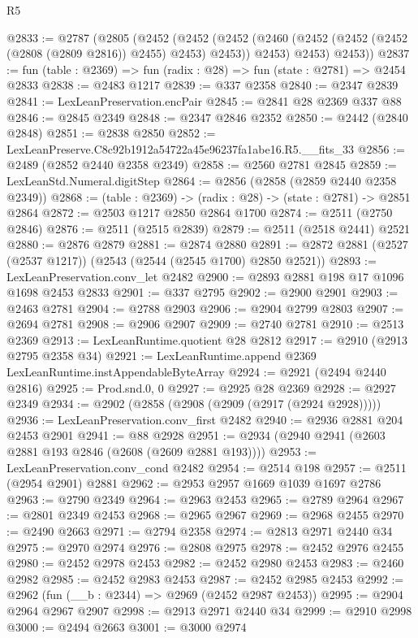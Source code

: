 \begin{lexlean}{R5}
\begin{coremodule}
@2833 := @2787
    (@2805
      (@2452
        (@2452
          (@2452 (@2460 (@2452 (@2452 (@2452 (@2808 (@2809 @2816)) @2455) @2453) @2453)) @2453)
          @2453)
        @2453))
@2837 := fun (table : @2369) => fun (radix : @28) => fun (state : @2781) => @2454 @2833
@2838 := @2483 @1217
@2839 := @337 @2358
@2840 := @2347 @2839
@2841 := LexLeanPreservation.encPair
@2845 := @2841 @28 @2369 @337 @88
@2846 := @2845 @2349
@2848 := @2347 @2846 @2352
@2850 := @2442 (@2840 @2848)
@2851 := @2838 @2850
@2852 := LexLeanPreserve.C8c92b1912a54722a45e96237fa1abe16.R5.__fits_33
@2856 := @2489 (@2852 @2440 @2358 @2349)
@2858 := @2560 @2781 @2845
@2859 := LexLeanStd.Numeral.digitStep
@2864 := @2856 (@2858 (@2859 @2440 @2358 @2349))
@2868 := (table : @2369) -> (radix : @28) -> (state : @2781) -> @2851 @2864
@2872 := @2503 @1217 @2850 @2864 @1700
@2874 := @2511 (@2750 @2846)
@2876 := @2511 (@2515 @2839)
@2879 := @2511 (@2518 @2441) @2521
@2880 := @2876 @2879
@2881 := @2874 @2880
@2891 := @2872 @2881 (@2527 (@2537 @1217)) (@2543 (@2544 (@2545 @1700) @2850 @2521))
@2893 := LexLeanPreservation.conv_let @2482
@2900 := @2893 @2881 @198 @17 @1096 @1698 @2453 @2833
@2901 := @337 @2795
@2902 := @2900 @2901
@2903 := @2463 @2781
@2904 := @2788 @2903
@2906 := @2904 @2799 @2803
@2907 := @2694 @2781
@2908 := @2906 @2907
@2909 := @2740 @2781
@2910 := @2513 @2369
@2913 := LexLeanRuntime.quotient @28 @2812
@2917 := @2910 (@2913 @2795 @2358 @34)
@2921 := LexLeanRuntime.append @2369 LexLeanRuntime.instAppendableByteArray
@2924 := @2921 (@2494 @2440 @2816)
@2925 := Prod.snd.{0, 0}
@2927 := @2925 @28 @2369
@2928 := @2927 @2349
@2934 := @2902 (@2858 (@2908 (@2909 (@2917 (@2924 @2928)))))
@2936 := LexLeanPreservation.conv_first @2482
@2940 := @2936 @2881 @204 @2453 @2901
@2941 := @88 @2928
@2951 := @2934 (@2940 @2941 (@2603 @2881 @193 @2846 (@2608 (@2609 @2881 @193))))
@2953 := LexLeanPreservation.conv_cond @2482
@2954 := @2514 @198
@2957 := @2511 (@2954 @2901) @2881
@2962 := @2953 @2957 @1669 @1039 @1697 @2786
@2963 := @2790 @2349
@2964 := @2963 @2453
@2965 := @2789 @2964
@2967 := @2801 @2349 @2453
@2968 := @2965 @2967
@2969 := @2968 @2455
@2970 := @2490 @2663
@2971 := @2794 @2358
@2974 := @2813 @2971 @2440 @34
@2975 := @2970 @2974
@2976 := @2808 @2975
@2978 := @2452 @2976 @2455
@2980 := @2452 @2978 @2453
@2982 := @2452 @2980 @2453
@2983 := @2460 @2982
@2985 := @2452 @2983 @2453
@2987 := @2452 @2985 @2453
@2992 := @2962 (fun (__b : @2344) => @2969 (@2452 @2987 @2453))
@2995 := @2904 @2964 @2967 @2907
@2998 := @2913 @2971 @2440 @34
@2999 := @2910 @2998
@3000 := @2494 @2663
@3001 := @3000 @2974

\end{coremodule}
\end{lexlean}
